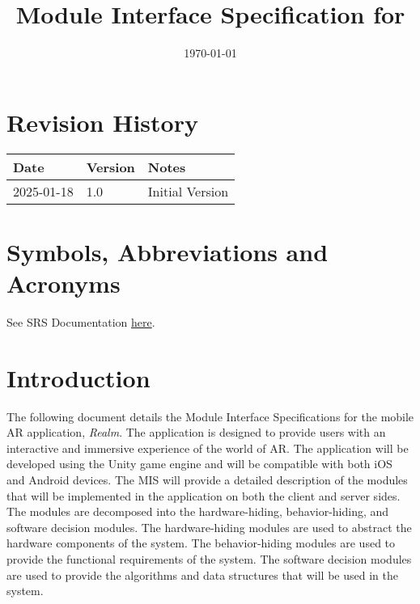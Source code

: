 \documentclass[12pt, titlepage]{article}
\begin{document}
\title{Module Interface Specification for \progname{}}

\author{\authname}

\date{\today}

\maketitle


\section{Revision History}

\begin{tabularx}{\textwidth}{p{3cm}p{2cm}X}
  \toprule {\bf Date} & {\bf Version} & {\bf Notes} \\
  \midrule
  2025-01-18              & 1.0           & Initial Version       \\
  \bottomrule
\end{tabularx}

\newpage

\section{Symbols, Abbreviations and Acronyms}

See SRS Documentation \href{https://github.com/russellrd/realm/blob/main/docs/SRS-IEEE/SRS.pdf}{here}.

\newpage

\tableofcontents

\newpage


\section{Introduction}

The following document details the Module Interface Specifications for the mobile AR application, \textit{Realm}. The application is designed to provide users with an interactive and immersive experience of the world of AR. The application will be developed using the Unity game engine and will be compatible with both iOS and Android devices. The MIS will provide a detailed description of the modules that will be implemented in the application on both the client and server sides. The modules are decomposed into the hardware-hiding, behavior-hiding, and software decision modules. The hardware-hiding modules are used to abstract the hardware components of the system. The behavior-hiding modules are used to provide the functional requirements of the system. The software decision modules are used to provide the algorithms and data structures that will be used in the system. \\
\end{document}
